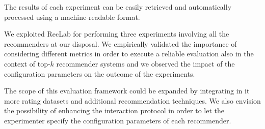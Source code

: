 The results of each experiment can be easily retrieved and automatically processed using a machine-readable format.

We exploited RecLab for performing three experiments involving all the recommenders at our disposal. We empirically validated the importance of considering different metrics in order to execute a reliable evaluation also in the context of top-$k$ recommender systems and we observed the impact of the configuration parameters on the outcome of the experiments.

The scope of this evaluation framework could be expanded by integrating in it more rating datasets and additional recommendation techniques. We also envision the possibility of enhancing the interaction protocol in order to let the experimenter specify the configuration parameters of each recommender.
